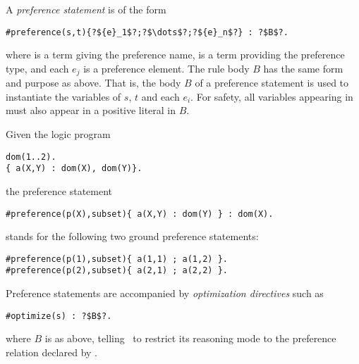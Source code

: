 A \emph{preference statement} is of the form %
\begin{lstlisting}[numbers=none,escapechar=?]
#preference(s,t){?${e}_1$?;?$\dots$?;?${e}_n$?} : ?$B$?.
\end{lstlisting}
%
where  is a term giving the preference name, 
 is a  
term providing the preference type, 
and each $e_j$ is a preference element.
The rule body $B$ has the same form and purpose as above.
%
That is, the body $B$ of a preference statement is used to instantiate the variables of $s$, $t$ and each $e_i$.
For safety, all variables appearing in  must also appear in a positive literal in $B$.

\begin{example}
\label{asprin:example2}
Given the logic program 
\begin{lstlisting}[numbers=none]
dom(1..2).
{ a(X,Y) : dom(X), dom(Y)}.
\end{lstlisting}
the preference statement 
\begin{lstlisting}[numbers=none]
#preference(p(X),subset){ a(X,Y) : dom(Y) } : dom(X).
\end{lstlisting}
stands for the following two ground preference statements:
\begin{lstlisting}[numbers=none]
#preference(p(1),subset){ a(1,1) ; a(1,2) }.
#preference(p(2),subset){ a(2,1) ; a(2,2) }.
\end{lstlisting}
\end{example}

Preference statements are accompanied by 
\emph{optimization directives} such as
\begin{lstlisting}[numbers=none,escapechar=?]
#optimize(s) : ?$B$?.
\end{lstlisting}
where $B$ is as above, 
telling \asprin\ to restrict its reasoning mode to the preference relation declared by .
% 

